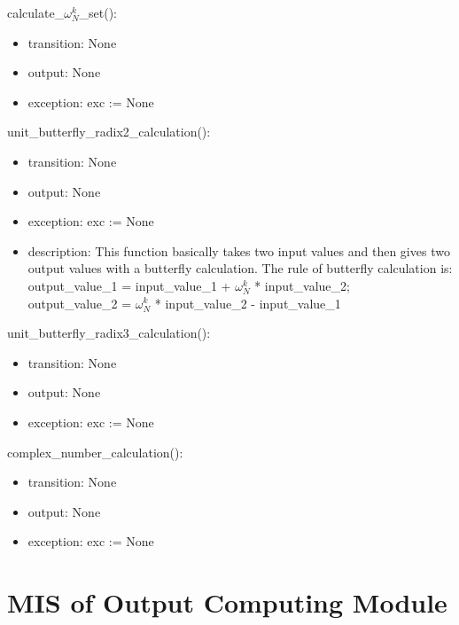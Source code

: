 \documentclass[12pt, titlepage]{article}
\begin{document}
calculate\_$\omega _{N}^{k}$\_set():
\begin{itemize}
\item transition: None
\item output:  None
\item exception: exc := None

\end{itemize}
unit\_butterfly\_radix2\_calculation():
\begin{itemize}
\item transition: None
\item output:  None
\item exception: exc := None
\item description: This function basically takes two input values and then gives two output values with a butterfly calculation. The rule of butterfly calculation is: 
\\output\_value\_1 = input\_value\_1 + $\omega_{N}^{k}$ * input\_value\_2;  
\\output\_value\_2 = $\omega_{N}^{k}$ * input\_value\_2 -  input\_value\_1 
\end{itemize}
unit\_butterfly\_radix3\_calculation():
\begin{itemize}
\item transition: None
\item output:  None
\item exception: exc := None
\end{itemize}
complex\_number\_calculation():
\begin{itemize}
\item transition: None
\item output:  None
\item exception: exc := None
\end{itemize}




\section{MIS of Output Computing Module} \label{Input} 
\end{document}

